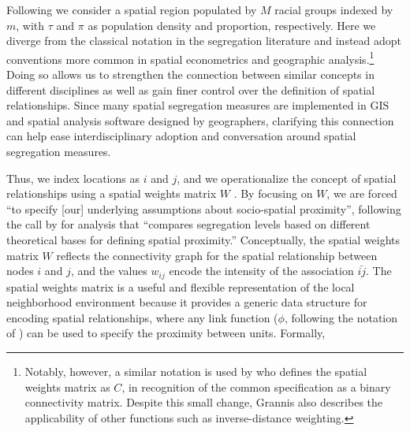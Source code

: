 \documentclass[
  10pt,
]{article}
\begin{document}
Following \citet{reardon2004MeasuresSpatial} we consider a spatial
region populated by \(M\) racial groups indexed by \(m\), with \(\tau\)
and \(\pi\) as population density and proportion, respectively. Here we
diverge from the classical notation in the segregation literature and
instead adopt conventions more common in spatial econometrics and
geographic analysis.\footnote{Notably, however, a similar notation is
  used by \citet{grannis2002DiscussionSegregation} who defines the
  spatial weights matrix as \(C\), in recognition of the common
  specification as a binary connectivity matrix. Despite this small
  change, Grannis also describes the applicability of other functions
  such as inverse-distance weighting.} Doing so allows us to strengthen
the connection between similar concepts in different disciplines as well
as gain finer control over the definition of spatial relationships.
Since many spatial segregation measures are implemented in GIS and
spatial analysis software designed by geographers, clarifying this
connection can help ease interdisciplinary adoption and conversation
around spatial segregation measures.

Thus, we index locations as \(i\) and \(j\), and we operationalize the
concept of spatial relationships using a spatial weights matrix \(W\)
\citep{cliff1970SpatialAutocorrelation}. By focusing on \(W\), we are
forced ``to specify {[}our{]} underlying assumptions about socio-spatial
proximity'', following the call by
\citet[p.154]{reardon2004MeasuresSpatial} for analysis that ``compares
segregation levels based on different theoretical bases for defining
spatial proximity.'' Conceptually, the spatial weights matrix \(W\)
reflects the connectivity graph for the spatial relationship between
nodes \(i\) and \(j\), and the values \(w_{ij}\) encode the intensity of
the association \(\bar{ij}\). The spatial weights matrix is a useful and
flexible representation of the local neighborhood environment because it
provides a generic data structure for encoding spatial relationships,
where any link function (\(\phi\), following the notation of
\citet{reardon2004MeasuresSpatial}) can be used to specify the proximity
between units. Formally,
\end{document}
